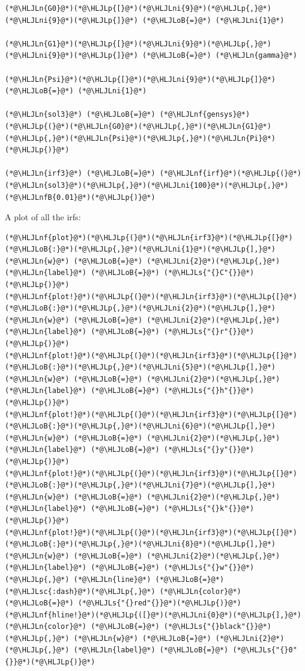 \documentclass[12pt,a4paper]{article}
\newcommand{\HLJLn}[1]{#1}
\newcommand{\HLJLnf}[1]{\textcolor[RGB]{66,102,213}{#1}}
\newcommand{\HLJLs}[1]{\textcolor[RGB]{201,61,57}{#1}}
\newcommand{\HLJLsc}[1]{\textcolor[RGB]{201,61,57}{#1}}
\newcommand{\HLJLnfB}[1]{\textcolor[RGB]{59,151,46}{#1}}
\newcommand{\HLJLni}[1]{\textcolor[RGB]{59,151,46}{#1}}
\newcommand{\HLJLoB}[1]{\textcolor[RGB]{102,102,102}{\textbf{#1}}}
\newcommand{\HLJLp}[1]{#1}
\begin{document}
\begin{lstlisting}
(*@\HLJLn{G0}@*)(*@\HLJLp{[}@*)(*@\HLJLni{9}@*)(*@\HLJLp{,}@*)(*@\HLJLni{9}@*)(*@\HLJLp{]}@*) (*@\HLJLoB{=}@*) (*@\HLJLni{1}@*)

(*@\HLJLn{G1}@*)(*@\HLJLp{[}@*)(*@\HLJLni{9}@*)(*@\HLJLp{,}@*)(*@\HLJLni{9}@*)(*@\HLJLp{]}@*) (*@\HLJLoB{=}@*) (*@\HLJLn{gamma}@*)

(*@\HLJLn{Psi}@*)(*@\HLJLp{[}@*)(*@\HLJLni{9}@*)(*@\HLJLp{]}@*) (*@\HLJLoB{=}@*) (*@\HLJLni{1}@*)

(*@\HLJLn{sol3}@*) (*@\HLJLoB{=}@*) (*@\HLJLnf{gensys}@*)(*@\HLJLp{(}@*)(*@\HLJLn{G0}@*)(*@\HLJLp{,}@*)(*@\HLJLn{G1}@*)(*@\HLJLp{,}@*)(*@\HLJLn{Psi}@*)(*@\HLJLp{,}@*)(*@\HLJLn{Pi}@*)(*@\HLJLp{)}@*)

(*@\HLJLn{irf3}@*) (*@\HLJLoB{=}@*) (*@\HLJLnf{irf}@*)(*@\HLJLp{(}@*)(*@\HLJLn{sol3}@*)(*@\HLJLp{,}@*)(*@\HLJLni{100}@*)(*@\HLJLp{,}@*)(*@\HLJLnfB{0.01}@*)(*@\HLJLp{)}@*)
\end{lstlisting}


A plot of all the irfs:


\begin{lstlisting}
(*@\HLJLnf{plot}@*)(*@\HLJLp{(}@*)(*@\HLJLn{irf3}@*)(*@\HLJLp{[}@*)(*@\HLJLoB{:}@*)(*@\HLJLp{,}@*)(*@\HLJLni{1}@*)(*@\HLJLp{],}@*) (*@\HLJLn{w}@*) (*@\HLJLoB{=}@*) (*@\HLJLni{2}@*)(*@\HLJLp{,}@*) (*@\HLJLn{label}@*) (*@\HLJLoB{=}@*) (*@\HLJLs{"{}C"{}}@*)(*@\HLJLp{)}@*)
(*@\HLJLnf{plot!}@*)(*@\HLJLp{(}@*)(*@\HLJLn{irf3}@*)(*@\HLJLp{[}@*)(*@\HLJLoB{:}@*)(*@\HLJLp{,}@*)(*@\HLJLni{2}@*)(*@\HLJLp{],}@*) (*@\HLJLn{w}@*) (*@\HLJLoB{=}@*) (*@\HLJLni{2}@*)(*@\HLJLp{,}@*) (*@\HLJLn{label}@*) (*@\HLJLoB{=}@*) (*@\HLJLs{"{}r"{}}@*)(*@\HLJLp{)}@*)
(*@\HLJLnf{plot!}@*)(*@\HLJLp{(}@*)(*@\HLJLn{irf3}@*)(*@\HLJLp{[}@*)(*@\HLJLoB{:}@*)(*@\HLJLp{,}@*)(*@\HLJLni{5}@*)(*@\HLJLp{],}@*) (*@\HLJLn{w}@*) (*@\HLJLoB{=}@*) (*@\HLJLni{2}@*)(*@\HLJLp{,}@*) (*@\HLJLn{label}@*) (*@\HLJLoB{=}@*) (*@\HLJLs{"{}h"{}}@*)(*@\HLJLp{)}@*)
(*@\HLJLnf{plot!}@*)(*@\HLJLp{(}@*)(*@\HLJLn{irf3}@*)(*@\HLJLp{[}@*)(*@\HLJLoB{:}@*)(*@\HLJLp{,}@*)(*@\HLJLni{6}@*)(*@\HLJLp{],}@*) (*@\HLJLn{w}@*) (*@\HLJLoB{=}@*) (*@\HLJLni{2}@*)(*@\HLJLp{,}@*) (*@\HLJLn{label}@*) (*@\HLJLoB{=}@*) (*@\HLJLs{"{}y"{}}@*)(*@\HLJLp{)}@*)
(*@\HLJLnf{plot!}@*)(*@\HLJLp{(}@*)(*@\HLJLn{irf3}@*)(*@\HLJLp{[}@*)(*@\HLJLoB{:}@*)(*@\HLJLp{,}@*)(*@\HLJLni{7}@*)(*@\HLJLp{],}@*) (*@\HLJLn{w}@*) (*@\HLJLoB{=}@*) (*@\HLJLni{2}@*)(*@\HLJLp{,}@*) (*@\HLJLn{label}@*) (*@\HLJLoB{=}@*) (*@\HLJLs{"{}k"{}}@*)(*@\HLJLp{)}@*)
(*@\HLJLnf{plot!}@*)(*@\HLJLp{(}@*)(*@\HLJLn{irf3}@*)(*@\HLJLp{[}@*)(*@\HLJLoB{:}@*)(*@\HLJLp{,}@*)(*@\HLJLni{8}@*)(*@\HLJLp{],}@*) (*@\HLJLn{w}@*) (*@\HLJLoB{=}@*) (*@\HLJLni{2}@*)(*@\HLJLp{,}@*) (*@\HLJLn{label}@*) (*@\HLJLoB{=}@*) (*@\HLJLs{"{}w"{}}@*)(*@\HLJLp{,}@*) (*@\HLJLn{line}@*) (*@\HLJLoB{=}@*) (*@\HLJLsc{:dash}@*)(*@\HLJLp{,}@*) (*@\HLJLn{color}@*) (*@\HLJLoB{=}@*) (*@\HLJLs{"{}red"{}}@*)(*@\HLJLp{)}@*)
(*@\HLJLnf{hline!}@*)(*@\HLJLp{([}@*)(*@\HLJLni{0}@*)(*@\HLJLp{],}@*) (*@\HLJLn{color}@*) (*@\HLJLoB{=}@*) (*@\HLJLs{"{}black"{}}@*)(*@\HLJLp{,}@*) (*@\HLJLn{w}@*) (*@\HLJLoB{=}@*) (*@\HLJLni{2}@*)(*@\HLJLp{,}@*) (*@\HLJLn{label}@*) (*@\HLJLoB{=}@*) (*@\HLJLs{"{}0"{}}@*)(*@\HLJLp{)}@*)
\end{lstlisting}
\end{document}
